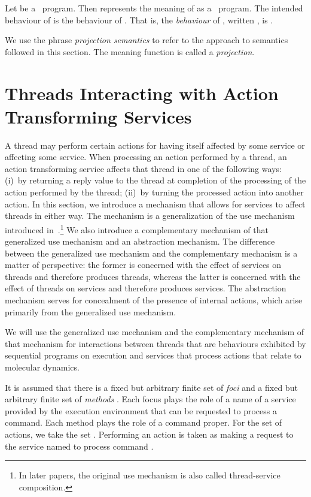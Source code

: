 \documentclass[fleqn]{llncs}
\begin{document}
\sloppy
Let  be a \PGLD\ program.
Then  represents the meaning of  as a \PGA\ program.
The intended behaviour of  is the behaviour of .
That is, the \emph{behaviour} of , written , is
.

We use the phrase \emph{projection semantics} to refer to the approach
to semantics followed in this section.
The meaning function  is called a \emph{projection}.

\section{Threads Interacting with Action Transforming Services}
\label{sect-TSI}

A thread may perform certain actions for having itself affected by some
service or affecting some service.
When processing an action performed by a thread, an action transforming
service affects that thread in one of the following ways:
(i)~by returning a reply value to the thread at completion of the
processing of the action performed by the thread;
(ii)~by turning the processed action into another action.
In this section, we introduce a mechanism that allows for services to
affect threads in either way.
The mechanism is a generalization of the use mechanism introduced
in~\cite{BM04c}.\footnote
{In later papers, the original use mechanism is also called
 thread-service composition.}
We also introduce a complementary mechanism of that generalized use
mechanism and an abstraction mechanism.
The difference between the generalized use mechanism and the
complementary mechanism is a matter of perspective:
the former is concerned with the effect of services on threads and
therefore produces threads, whereas the latter is concerned with the
effect of threads on services and therefore produces services.
The abstraction mechanism serves for concealment of the presence of
internal actions, which arise primarily from the generalized use
mechanism.

We will use the generalized use mechanism and the complementary
mechanism of that mechanism for interactions between threads that are
behaviours exhibited by sequential programs on execution and services
that process actions that relate to molecular dynamics.

It is assumed that there is a fixed but arbitrary finite set of
\emph{foci}  and a fixed but arbitrary finite set of
\emph{methods} .
Each focus plays the role of a name of a service provided by the
execution environment that can be requested to process a command.
Each method plays the role of a command proper.
For the set  of actions, we take the set
.
Performing an action  is taken as making a request to the
service named  to process command .
\end{document}
